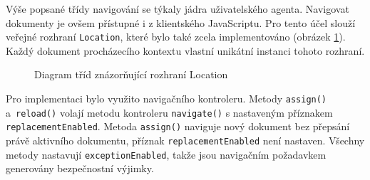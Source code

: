 Výše popsané třídy navigování se týkaly jádra uživatelského agenta. Navigovat dokumenty je ovšem přístupné i z klientského JavaScriptu. Pro tento účel slouží veřejné rozhraní \texttt{Location}, které bylo také zcela implementováno (obrázek \ref{Figure.Location}). Každý dokument procházecího kontextu vlastní unikátní instanci tohoto rozhraní.

\begin{figure}[H]
  \begin{center}
    \caption{Diagram tříd znázorňující rozhraní Location}
    \label{Figure.Location}
  \end{center}
\end{figure}
 
Pro implementaci bylo využito navigačního kontroleru. Metody \texttt{assign()} a~\texttt{reload()} volají metodu kontroleru \texttt{navigate()} s nastaveným příznakem \texttt{replacementEnabled}. Metoda \texttt{assign()} naviguje nový dokument bez přepsání právě aktivního dokumentu, příznak \texttt{replacementEnabled} není nastaven. Všechny metody nastavují \texttt{exceptionEnabled}, takže jsou navigačním požadavkem generovány bezpečnostní výjimky.

